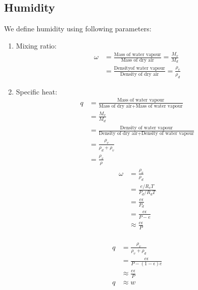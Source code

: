 \documentclass[fleqn,10pt]{SelfArx} %
\begin{document}
\subsection{Humidity}
We define humidity using following parameters:
\begin{enumerate}
    \item Mixing ratio:
        \begin{align}
            \omega &= \frac{ \text{Mass of water vapour}}{\text{Mass of dry air}} = \frac{M_v}{M_d} \\
                   &=\frac{ \text{Densityof water vapour}}{\text{Density of dry air}}= \frac{\rho_v}{\rho_d}
            \label{eq:mixingratio}
        \end{align}
    \item Specific heat:
        \begin{align}
            q &= \frac{ \text{Mass of water vapour}}{\text{Mass of dry air} + \text{Mass of water vapour}} \\
              &= \frac{M_v}{M_d} \\
              &= \frac{ \text{Density of water vapour}}{\text{Density of dry air} + \text{Density of water vapour}} \\
              &= \frac{\rho_v}{\rho_d+\rho_v} \\
              &= \frac{\rho_v}{\rho}
            \label{Specificheat}
        \end{align}
        \begin{align}
            \omega &= \frac{\rho_v}{\rho_d} \\
                &= \frac{e/R_v T}{P_d/R_d T} \\
                &= \frac{e\epsilon}{P_d} \\ 
                &= \frac{e\epsilon}{P-e} \\
                &\approx \frac{e\epsilon}{P}
        \end{align}
         \\
    \begin{align*}
        q &= \frac{\rho_v}{\rho_v + \rho_d} \\
          &= \frac{e\epsilon}{P-(1-\epsilon)e} \\
          &\approx \frac{e\epsilon}{P} \\ 
        q &\approx w   
    \end{align*}
\end{enumerate}
\end{document}
